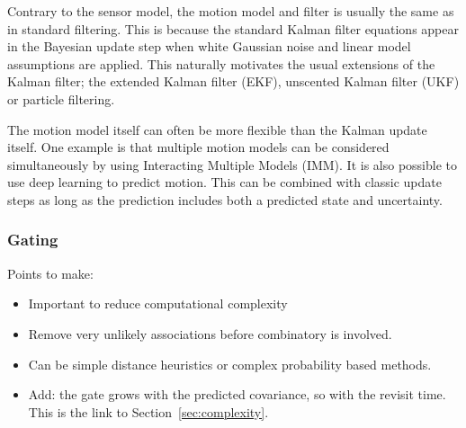 Contrary to the sensor model, the motion model and filter is usually the same as in standard filtering. This is because the standard Kalman filter equations appear in the Bayesian update step when white Gaussian noise and linear model assumptions are applied. This naturally motivates the usual extensions of the Kalman filter; the extended Kalman filter (EKF), unscented Kalman filter (UKF) or particle filtering.
\medskip

The motion model itself can often be more flexible than the Kalman update itself. One example is that multiple motion models can be considered simultaneously by using Interacting Multiple Models (IMM). It is also possible to use deep learning to predict motion. This can be combined with classic update steps as long as the prediction includes both a predicted state and uncertainty.

\subsubsection{Gating}
Points to make:
\begin{itemize}
    \item Important to reduce computational complexity
    \item Remove very unlikely associations before combinatory is involved.
    \item Can be simple distance heuristics or complex probability based methods.
\end{itemize}
\begin{itemize}
    \item Add: the gate grows with the predicted covariance, so with the revisit time. This is the link to Section~\ref{sec:complexity}.
\end{itemize}

